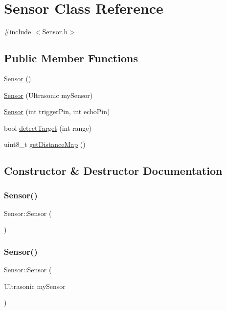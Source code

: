 \hypertarget{class_sensor}{}\section{Sensor Class Reference}
\label{class_sensor}


{\ttfamily \#include $<$Sensor.\+h$>$}

\subsection*{Public Member Functions}
\begin{DoxyCompactItemize}
\item 
\hyperlink{class_sensor_a342d6d11ef572c8cba92cb76fb1a294b}{Sensor} ()
\item 
\hyperlink{class_sensor_a3da92e2f50bc0354ef2a5928fa4a6694}{Sensor} (Ultrasonic my\+Sensor)
\item 
\hyperlink{class_sensor_a3f736371574f64dbc9e42eae0c2f6ff6}{Sensor} (int trigger\+Pin, int echo\+Pin)
\item 
bool \hyperlink{class_sensor_a30bad6b427addc330c4ec3136d24f6e8}{detect\+Target} (int range)
\item 
uint8\+\_\+t \hyperlink{class_sensor_abb752f4a88eda6d4fd34f74cce1b82dc}{get\+Distance\+Map} ()
\end{DoxyCompactItemize}


\subsection{Constructor \& Destructor Documentation}
\mbox{\label{class_sensor_a342d6d11ef572c8cba92cb76fb1a294b}} 
\subsubsection{\texorpdfstring{Sensor()}{Sensor()}\hspace{0.1cm}{\footnotesize\ttfamily [1/3]}}
{\footnotesize\ttfamily Sensor\+::\+Sensor (\begin{DoxyParamCaption}{ }\end{DoxyParamCaption})}

\mbox{\label{class_sensor_a3da92e2f50bc0354ef2a5928fa4a6694}} 
\subsubsection{\texorpdfstring{Sensor()}{Sensor()}\hspace{0.1cm}{\footnotesize\ttfamily [2/3]}}
{\footnotesize\ttfamily Sensor\+::\+Sensor (\begin{DoxyParamCaption}\item[{Ultrasonic}]{my\+Sensor }\end{DoxyParamCaption})}

